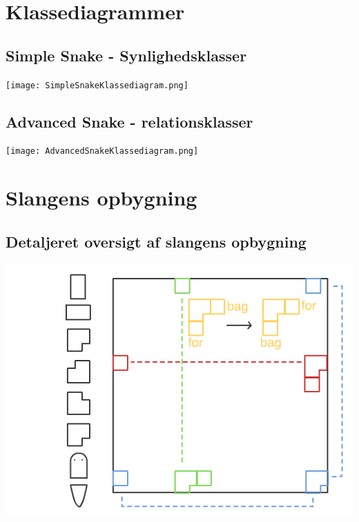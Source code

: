 \chapter{Klassediagrammer}
\section{Simple Snake - Synlighedsklasser}
\graphicspath{ {pics/} }
\texttt{[image: SimpleSnakeKlassediagram.png]}

\section{Advanced Snake - relationsklasser}
\graphicspath{ {pics/} }
\texttt{[image: AdvancedSnakeKlassediagram.png]}

\chapter{Slangens opbygning}
\section{Detaljeret oversigt af slangens opbygning}
\graphicspath{ {pics/} }
\includegraphics[width=1\textwidth]{SnakeGraphic.png}
